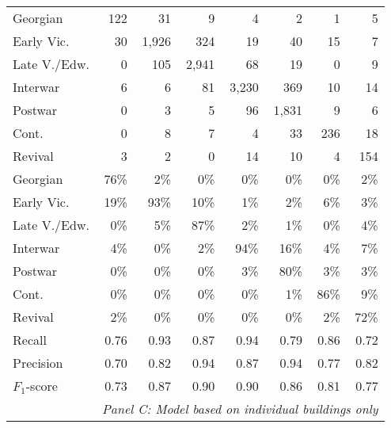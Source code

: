 \begin{table}[!htb]
\begin{tabular}{lrrrrrrr}
Georgian & 122 & 31 & 9 & 4 & 2 & 1 & 5 \\
Early Vic. & 30 & 1,926 & 324 & 19 & 40 & 15 & 7 \\
  Late V./Edw. & 0 & 105 & 2,941 & 68 & 19 & 0 & 9 \\
 Interwar & 6 & 6 & 81 & 3,230 & 369 & 10 & 14 \\
 Postwar & 0 & 3 & 5 & 96 & 1,831 & 9 & 6 \\
 Cont. & 0 & 8 & 7 & 4 & 33 & 236 & 18 \\
 Revival & 3 & 2 & 0 & 14 & 10 & 4 & 154 \\
 \cmidrule(lr){1-1}
\cmidrule(lr){2-8}
 Georgian & 76\% & 2\% & 0\% & 0\% & 0\% & 0\% & 2\% \\
 Early Vic. & 19\% & 93\% & 10\% & 1\% & 2\% & 6\% & 3\% \\
  Late V./Edw. & 0\% & 5\% & 87\% & 2\% & 1\% & 0\% & 4\% \\
 Interwar & 4\% & 0\% & 2\% & 94\% & 16\% & 4\% & 7\% \\
 Postwar & 0\% & 0\% & 0\% & 3\% & 80\% & 3\% & 3\% \\
 Cont. & 0\% & 0\% & 0\% & 0\% & 1\% & 86\% & 9\% \\
Revival & 2\% & 0\% & 0\% & 0\% & 0\% & 2\% & 72\% \\
\cmidrule(lr){1-1}
\cmidrule(lr){2-8}
Recall & 0.76 & 0.93 & 0.87 & 0.94 & 0.79 & 0.86 & 0.72 \\
 Precision & 0.70 & 0.82 & 0.94 & 0.87 & 0.94 & 0.77 & 0.82 \\
$F_1$-score & 0.73 & 0.87 & 0.90 & 0.90 & 0.86 & 0.81 & 0.77 \\

\cmidrule(lr){1-1} \cmidrule(lr){2-8}
& \multicolumn{7}{c}{ \emph{Panel C: Model based on individual buildings only} \rule{0pt}{4ex}    }\\
\cmidrule(lr){1-1} \cmidrule(lr){2-8}


\end{tabular}
\end{table}
